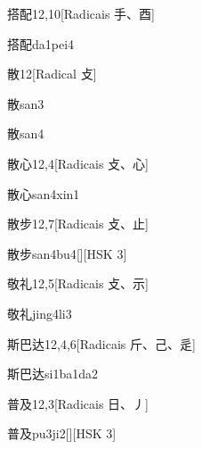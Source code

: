 \begin{entry}{搭配}{12,10}[Radicais ⼿、⾣]
  \begin{phonetics}{搭配}{da1pei4}
  \end{phonetics}
\end{entry}

\begin{entry}{散}{12}[Radical ⽁]
  \begin{phonetics}{散}{san3}
  \end{phonetics}
  \begin{phonetics}{散}{san4}
  \end{phonetics}
\end{entry}

\begin{entry}{散心}{12,4}[Radicais ⽁、⼼]
  \begin{phonetics}{散心}{san4xin1}
  \end{phonetics}
\end{entry}

\begin{entry}{散步}{12,7}[Radicais ⽁、⽌]
  \begin{phonetics}{散步}{san4bu4}[][HSK 3]
  \end{phonetics}
\end{entry}

\begin{entry}{敬礼}{12,5}[Radicais ⽁、⽰]
  \begin{phonetics}{敬礼}{jing4li3}
  \end{phonetics}
\end{entry}

\begin{entry}{斯巴达}{12,4,6}[Radicais ⽄、⼰、⾡]
  \begin{phonetics}{斯巴达}{si1ba1da2}
  \end{phonetics}
\end{entry}

\begin{entry}{普及}{12,3}[Radicais ⽇、⼃]
  \begin{phonetics}{普及}{pu3ji2}[][HSK 3]
  \end{phonetics}
\end{entry}

